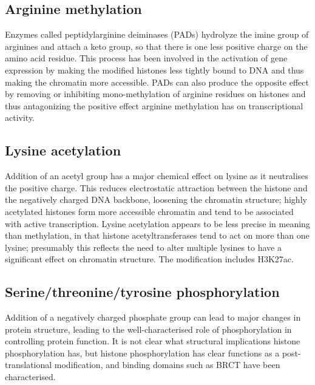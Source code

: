 \hypertarget{arginine-methylation}{%
\subsection{Arginine methylation}\label{arginine-methylation}}

Enzymes called peptidylarginine deiminases (PADs) hydrolyze the imine group of arginines and attach a keto group, so that there is one less positive charge on the amino acid residue. This process has been involved in the activation of gene expression by making the modified histones less tightly bound to DNA and thus making the chromatin more accessible. PADs can also produce the opposite effect by removing or inhibiting mono-methylation of arginine residues on histones and thus antagonizing the positive effect arginine methylation has on transcriptional activity.

\hypertarget{lysine-acetylation}{%
\subsection{Lysine acetylation}\label{lysine-acetylation}}

Addition of an acetyl group has a major chemical effect on lysine as it neutralises the positive charge. This reduces electrostatic attraction between the histone and the negatively charged DNA backbone, loosening the chromatin structure; highly acetylated histones form more accessible chromatin and tend to be associated with active transcription. Lysine acetylation appears to be less precise in meaning than methylation, in that histone acetyltransferases tend to act on more than one lysine; presumably this reflects the need to alter multiple lysines to have a significant effect on chromatin structure. The modification includes H3K27ac.

\hypertarget{serinethreoninetyrosine-phosphorylation}{%
\subsection{Serine/threonine/tyrosine phosphorylation}\label{serinethreoninetyrosine-phosphorylation}}

Addition of a negatively charged phosphate group can lead to major changes in protein structure, leading to the well-characterised role of phosphorylation in controlling protein function. It is not clear what structural implications histone phosphorylation has, but histone phosphorylation has clear functions as a post-translational modification, and binding domains such as BRCT have been characterised.

